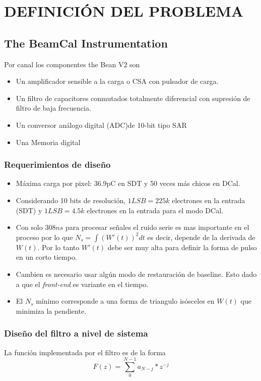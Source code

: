 \chapter{DEFINICIÓN DEL PROBLEMA}
\label{chapter:problem}
\section{The BeamCal Instrumentation }

Por canal los componentes the Bean V2 son 
\begin{itemize}
\item Un amplificador sensible a la carga o CSA con pulsador de carga.
\item Un filtro de capacitores conmutados totalmente diferencial con supresión de filtro de baja frecuencia.
\item Un conversor análogo digital (ADC)de 10-bit tipo SAR
\item Una Memoria digital
\end{itemize}

\subsection{Requerimientos de diseño}
\begin{itemize}
\item Máxima carga por pixel: 36.9pC en SDT y 50 veces más chicos en DCal.
\item Considerando 10 bits de resolución, $1LSB = 225k$ electrones en la entrada (SDT) y $1LSB = 4.5k$ electrones en la entrada para el modo DCal.
\item Con solo $308ns$ para procesar señales el ruido serie es mas importante en el proceso por lo que $N_s= \int(W'(t))^2dt$ es decir, depende de la derivada de $W(t)$. Por lo tanto $W'(t)$ debe ser muy alta para definir la forma de pulso en un corto tiempo.
\item Cambien es necesario usar algún modo de restauración de baseline. Esto dado a que el \textit{front-end} es variante en el tiempo.
\item El $N_s$ mínimo corresponde a una forma de triangulo isósceles en $W(t)$ que minimiza la pendiente.
\end{itemize}
\subsection{Diseño del filtro a nivel de sistema}
La función implementada por el filtro es de la forma
\begin{equation}
F(z)= \sum_{0}^{N-1} a_{N-j}*z^{-j}
\end{equation}

